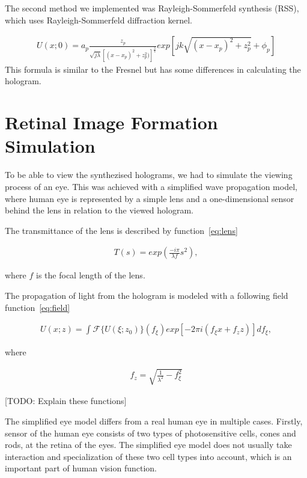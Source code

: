 \documentclass[12pt,a4paper,english
]{tunithesis}
\begin{document}
The second method we implemented was Rayleigh-Sommerfeld synthesis (RSS), which uses Rayleigh-Sommerfeld diffraction kernel. 

\begin{align}
  \label{eq:field}
  U(x;0) = a_p\frac{z_p}{\sqrt{j \lambda}[(x-x_p)^2+z_p^2)]^\frac{3}{4}}exp[jk\sqrt{(x-x_p)^2+z_p^2}+\phi_p]
\end{align}
This formula is similar to the Fresnel but has some differences in calculating the hologram. 

\section{Retinal Image Formation Simulation}
To be able to view the synthezised holograms, we had to simulate the viewing process of an eye. This was achieved with a simplified wave propagation model, where human eye is represented by a simple lens and a one-dimensional sensor behind the lens in relation to the viewed hologram.

The transmittance of the lens is described by function~\ref{eq:lens}

\begin{align}
  \label{eq:lens}
  T(s) = exp(\frac{-i\pi}{\lambda f}s^2),
\end{align}

where $f$ is the focal length of the lens.

The propagation of light from the hologram is modeled with a following field function~\ref{eq:field}

\begin{align}
  \label{eq:field}
  U(x;z) = \int \mathscr{F} \{U (\xi;z_0) \} (f_\xi) exp[-2 \pi i (f_\xi x + f_z z)] d f_\xi,
\end{align}

where

\begin{align}
  \label{eq:focus}
  f_z = \sqrt{\frac{1}{\lambda^2} - f_\xi ^ 2}
\end{align}

[TODO: Explain these functions]

The simplified eye model differs from a real human eye in multiple cases. Firstly, sensor of the human eye consists of two types of photosensitive cells, cones and rods, at the retina of the eyes. The simplified eye model does not usually take interaction and specialization of these two cell types into account, which is an important part of human vision function.
\end{document}
